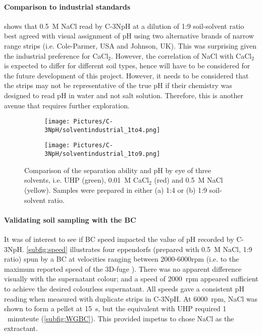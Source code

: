 \paragraph{Comparison to industrial standards} \label{c3nph:nacl}
 shows that \SI{0.5}{M} NaCl read by C-3NpH at a dilution of 1:9 soil-solvent ratio best agreed with visual assignment of pH using two alternative brands of narrow range strips (i.e. Cole-Parmer, USA and Johnson, UK). This was surprising given the industrial preference for CaCl$_2$. However, the correlation of NaCl with CaCl$_2$ is expected to differ for different soil types, hence will have to be considered for the future development of this project. However, it needs to be considered that the strips may not be representative of the true pH if their chemistry was designed to read pH in water and not salt solution. Therefore, this is another avenue that requires further exploration. 

\begin{figure}[h!]
	\centering
	\begin{subfigure}[b]{\linewidth} 
		\centering
		\texttt{[image: Pictures/C-3NpH/solventindustrial\_1to4.png]}
		\caption{}
		\label{subfig:solventind_1to4}
	\end{subfigure}
	\begin{subfigure}[b]{\linewidth}
	\centering
		\texttt{[image: Pictures/C-3NpH/solventindustrial\_1to9.png]}
		\caption{}
		\label{subfig:solventind_1to9}
	\end{subfigure}
	\caption{Comparison of the separation ability and pH by eye of three solvents, i.e. \gls{UHP} (green), \SI{0.01}{M} CaCl$_2$ (red) and \SI{0.5}{M} NaCl (yellow). Samples were prepared in either (a) 1:4 or (b) 1:9 soil-solvent ratio.}
\label{fig:solventindustrial}
\end{figure}   	


\paragraph{Validating soil sampling with the BC}
It was of interest to see if BC speed impacted the value of pH recorded by C-3NpH. \cref{subfig:speed} illustrates four eppendorfs (prepared with \SI{0.5}{M} NaCl, 1:9 ratio) spun by a \gls{BC} at velocities ranging between 2000-6000rpm (i.e. to the maximum reported speed of the 3D-fuge \cite{Byagathvalli2019}). There was no apparent difference visually with the supernatant colour; and a speed of \SI{2000}{rpm} appeared sufficient to achieve the desired colourless supernatant. All speeds gave a consistent pH reading when measured with duplicate strips in C-3NpH. At \SI{6000}{rpm}, NaCl was shown to form a pellet at \SI{15}{s}, but the equivalent with \gls{UHP} required \SI{1}{\\minuteute} (\cref{subfig:WGBC}). This provided impetus to chose NaCl as the extractant.

